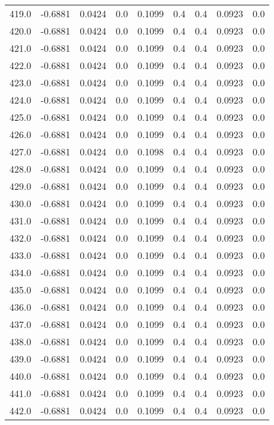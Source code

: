 \begin{longtable}{lrrrrrrrr}
419.0 & -0.6881 & 0.0424 & 0.0 & 0.1099 & 0.4 & 0.4 & 0.0923 & 0.0 \\
420.0 & -0.6881 & 0.0424 & 0.0 & 0.1099 & 0.4 & 0.4 & 0.0923 & 0.0 \\
421.0 & -0.6881 & 0.0424 & 0.0 & 0.1099 & 0.4 & 0.4 & 0.0923 & 0.0 \\
422.0 & -0.6881 & 0.0424 & 0.0 & 0.1099 & 0.4 & 0.4 & 0.0923 & 0.0 \\
423.0 & -0.6881 & 0.0424 & 0.0 & 0.1099 & 0.4 & 0.4 & 0.0923 & 0.0 \\
424.0 & -0.6881 & 0.0424 & 0.0 & 0.1099 & 0.4 & 0.4 & 0.0923 & 0.0 \\
425.0 & -0.6881 & 0.0424 & 0.0 & 0.1099 & 0.4 & 0.4 & 0.0923 & 0.0 \\
426.0 & -0.6881 & 0.0424 & 0.0 & 0.1099 & 0.4 & 0.4 & 0.0923 & 0.0 \\
427.0 & -0.6881 & 0.0424 & 0.0 & 0.1098 & 0.4 & 0.4 & 0.0923 & 0.0 \\
428.0 & -0.6881 & 0.0424 & 0.0 & 0.1099 & 0.4 & 0.4 & 0.0923 & 0.0 \\
429.0 & -0.6881 & 0.0424 & 0.0 & 0.1099 & 0.4 & 0.4 & 0.0923 & 0.0 \\
430.0 & -0.6881 & 0.0424 & 0.0 & 0.1099 & 0.4 & 0.4 & 0.0923 & 0.0 \\
431.0 & -0.6881 & 0.0424 & 0.0 & 0.1099 & 0.4 & 0.4 & 0.0923 & 0.0 \\
432.0 & -0.6881 & 0.0424 & 0.0 & 0.1099 & 0.4 & 0.4 & 0.0923 & 0.0 \\
433.0 & -0.6881 & 0.0424 & 0.0 & 0.1099 & 0.4 & 0.4 & 0.0923 & 0.0 \\
434.0 & -0.6881 & 0.0424 & 0.0 & 0.1099 & 0.4 & 0.4 & 0.0923 & 0.0 \\
435.0 & -0.6881 & 0.0424 & 0.0 & 0.1099 & 0.4 & 0.4 & 0.0923 & 0.0 \\
436.0 & -0.6881 & 0.0424 & 0.0 & 0.1099 & 0.4 & 0.4 & 0.0923 & 0.0 \\
437.0 & -0.6881 & 0.0424 & 0.0 & 0.1099 & 0.4 & 0.4 & 0.0923 & 0.0 \\
438.0 & -0.6881 & 0.0424 & 0.0 & 0.1099 & 0.4 & 0.4 & 0.0923 & 0.0 \\
439.0 & -0.6881 & 0.0424 & 0.0 & 0.1099 & 0.4 & 0.4 & 0.0923 & 0.0 \\
440.0 & -0.6881 & 0.0424 & 0.0 & 0.1099 & 0.4 & 0.4 & 0.0923 & 0.0 \\
441.0 & -0.6881 & 0.0424 & 0.0 & 0.1099 & 0.4 & 0.4 & 0.0923 & 0.0 \\
442.0 & -0.6881 & 0.0424 & 0.0 & 0.1099 & 0.4 & 0.4 & 0.0923 & 0.0 \\

\end{longtable}
